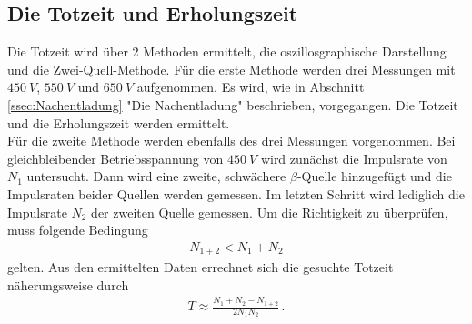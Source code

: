 \subsection{Die Totzeit und Erholungszeit}
Die Totzeit wird über 2 Methoden ermittelt,
die oszillosgraphische Darstellung und die Zwei-Quell-Methode.
Für die erste Methode werden drei Messungen mit $\SI{450}{V}$, $\SI{550}{V}$ und $\SI{650}{V}$ aufgenommen.
Es wird, wie in Abschnitt \ref{ssec:Nachentladung} "Die Nachentladung" beschrieben, vorgegangen.
Die Totzeit und die Erholungszeit werden ermittelt. \\
Für die zweite Methode werden ebenfalls des drei Messungen vorgenommen. Bei gleichbleibender Betriebsspannung von $\SI{450}{V}$
wird zunächst die Impulsrate von $N_{\text{1}}$ untersucht.
Dann wird eine zweite, schwächere $\beta$-Quelle hinzugefügt und die Impulsraten beider Quellen werden gemessen.
Im letzten Schritt wird lediglich die Impulsrate $N_{\text{2}}$ der zweiten Quelle gemessen.
Um die Richtigkeit zu überprüfen, muss folgende Bedingung
\begin{align}
   {N}_{1+2} < {N}_1 + {N}_2
\end{align}
gelten. Aus den ermittelten Daten errechnet sich die gesuchte Totzeit näherungsweise durch
\begin{align} 
    {T} \approx \frac{{N}_1+{N}_2-{N}_{1+2}}{2{N}_1{N}_2} \,.
\end{align}
\label{sec:Durchführung}

